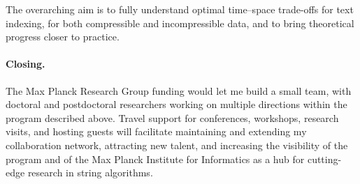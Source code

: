 \documentclass[a4paper,11pt]{article}
\begin{document}
The overarching aim is to fully understand optimal time--space trade-offs for text indexing, for both compressible and incompressible data, and to bring theoretical progress closer to practice.

\paragraph*{Closing.}

The Max Planck Research Group funding would let me build a small team, with doctoral and postdoctoral researchers working on multiple directions within the program described above. 
Travel support for conferences, workshops, research visits, and hosting guests will facilitate maintaining and extending my collaboration network, attracting new talent, and increasing the visibility of the program and of the Max Planck Institute for Informatics as a hub for cutting-edge research in string algorithms.

\singlespacing 
\let\oldthebibliography\thebibliography
\let\endoldthebibliography\endthebibliography
\renewenvironment{thebibliography}[1]{\small
  \begin{oldthebibliography}{#1}
    \setlength{\itemsep}{0em}
    \setlength{\parskip}{0em}
}
{
  \end{oldthebibliography}
}

{ 

 
}
\end{document}
